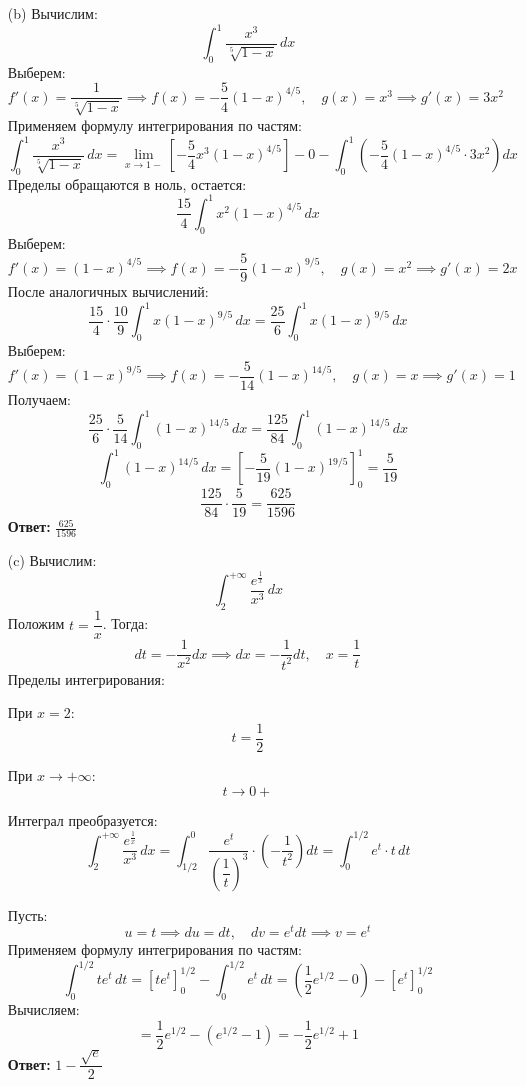 \documentclass[a4paper]{article}
\begin{document}
\begin{enumerate}
\begin{enumerate}
    \item[(b)]Вычислим:
    \[
    \int_{0}^{1} \frac{x^3}{\sqrt[5]{1-x}} \, dx
    \] 
    Выберем:  
    \[
    f'(x) = \frac{1}{\sqrt[5]{1-x}} \implies f(x) = -\frac{5}{4}(1-x)^{4/5},
     \quad g(x) = x^3 \implies g'(x) = 3x^2
    \]  
    Применяем формулу интегрирования по частям:  
    \[
    \int_{0}^{1} \frac{x^3}{\sqrt[5]{1-x}} \, dx =
     \lim_{x \to 1-} \left[ -\frac{5}{4}x^3(1-x)^{4/5} \right] - 0 -
      \int_{0}^{1} \left( -\frac{5}{4}(1-x)^{4/5} \cdot 3x^2 \right) dx
    \]  
    Пределы обращаются в ноль, остается:  
    \[
    \frac{15}{4} \int_{0}^{1} x^2(1-x)^{4/5} \, dx
    \]
    Выберем:  
    \[
    f'(x) = (1-x)^{4/5} \implies f(x) = -\frac{5}{9}(1-x)^{9/5}, 
    \quad g(x) = x^2 \implies g'(x) = 2x
    \]  
    После аналогичных вычислений:  
    \[
    \frac{15}{4} \cdot \frac{10}{9} \int_{0}^{1} x(1-x)^{9/5} \,
     dx = \frac{25}{6} \int_{0}^{1} x(1-x)^{9/5} \, dx
    \]
    Выберем:  
    \[
    f'(x) = (1-x)^{9/5} \implies f(x) = -\frac{5}{14}(1-x)^{14/5}, \quad g(x) 
    = x \implies g'(x) = 1
    \]  
    Получаем:  
    \[
    \frac{25}{6} \cdot \frac{5}{14} \int_{0}^{1} (1-x)^{14/5} \, dx
     = \frac{125}{84} \int_{0}^{1} (1-x)^{14/5} \, dx
    \]
    \[
    \int_{0}^{1} (1-x)^{14/5} \, dx = \left[ -\frac{5}{19}(1-x)^{19/5} 
    \right]_{0}^{1} = \frac{5}{19}
    \]
    \[
    \frac{125}{84} \cdot \frac{5}{19} = \frac{625}{1596}
    \]
    \textbf{Ответ: } $\frac{625}{1596}$\\

    \item[(c)]Вычислим:
    \[
    \int_{2}^{+\infty} \frac{e^{\frac{1}{x}}}{x^3} \, dx
    \] 
    Положим \( t = \dfrac{1}{x} \). Тогда:  
    \[
    dt = -\dfrac{1}{x^2} dx \implies dx = -\dfrac{1}{t^2} dt, \quad x = \dfrac{1}{t}
    \]  
    Пределы интегрирования:  

    При \( x = 2 \): \[ t = \dfrac{1}{2} \]

    При \( x \to +\infty \): \[ t \to 0+ \]

    Интеграл преобразуется:  
    \[
    \int_{2}^{+\infty} \frac{e^{\frac{1}{x}}}{x^3} \, dx =
     \int_{1/2}^{0} \frac{e^{t}}{\left(\dfrac{1}{t}\right)^3} \cdot
      \left(-\dfrac{1}{t^2}\right) dt = \int_{0}^{1/2} e^{t} \cdot t \, dt
    \]

    Пусть:  
    \[
    u = t \implies du = dt, \quad dv = e^{t} dt \implies v = e^{t}
    \]  
    Применяем формулу интегрирования по частям:  
    \[
    \int_{0}^{1/2} t e^{t} \, dt = \left[ t e^{t} \right]_{0}^{1/2} - 
    \int_{0}^{1/2} e^{t} \, dt = \left( \dfrac{1}{2} e^{1/2} - 0 \right) -
     \left[ e^{t} \right]_{0}^{1/2}
    \]  
    Вычисляем:  
    \[
    = \dfrac{1}{2} e^{1/2} - \left( e^{1/2} - 1 \right) = -\dfrac{1}{2} e^{1/2} + 1
    \]
    \textbf{Ответ: } $1 - \dfrac{\sqrt{e}}{2}$\\
    

\end{enumerate}
\end{enumerate}
\end{document}
